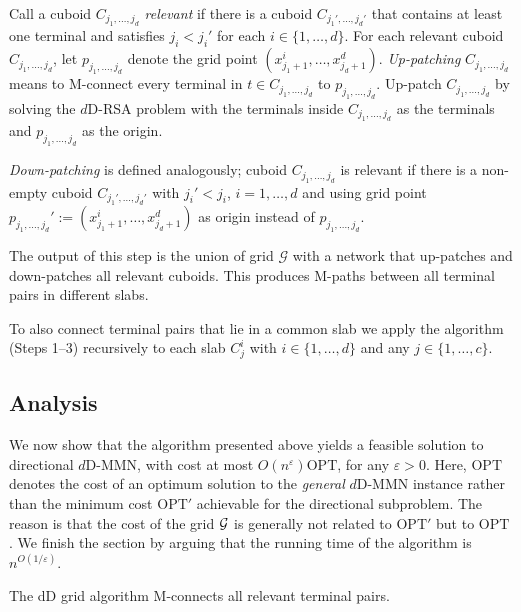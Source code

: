 \documentclass[11pt]{llncs}
\newcommand{\eps}{\ensuremath{\varepsilon}\xspace}
\newcommand{\opt}{\ensuremath{\mathrm{OPT}}\xspace}
\begin{document}
 Call a cuboid $C_{j_1,\dots,j_d}$
\emph{relevant} if there is a cuboid $C_{j_1',\dots,j_d'}$ that
contains at least one terminal and satisfies $j_i<j_i'$ for each
$i\in\{1,\dots,d\}$. For each relevant cuboid $C_{j_1,\dots,j_d}$, let
$p_{j_1,\dots,j_d}$ denote the grid point
$(x_{j_1+1}^i,\dots,x_{j_d+1}^d)$.  \emph{Up-patching}
$C_{j_1,\dots,j_d}$ means to M-connect every terminal in $t\in
C_{j_1,\dots,j_d}$ to $p_{j_1,\dots,j_d}$. Up-patch
$C_{j_1,\dots,j_d}$ by solving the $d$D-RSA problem with the terminals
inside $C_{j_1,\dots,j_d}$ as the terminals and $p_{j_1,\dots,j_d}$ as
the origin.

{\em Down-patching} is defined analogously; cuboid
$C_{j_1,\dots,j_d}$ is relevant if there is a non-empty cuboid
$C_{j_1',\dots,j_d'}$ with $j_i'<j_i$, $i=1,\dots,d$ and using grid
point $p_{j_1,\dots,j_d}':=(x_{j_1+1}^i,\dots,x_{j_d+1}^d)$ as origin
instead of $p_{j_1,\dots,j_d}$.

The output of this step is the union of grid $\mathcal G$ with a
network that up-patches and down-patches all relevant cuboids. This
produces M-paths between all terminal pairs in different slabs.

\smallskip
{}  To also connect
terminal pairs that lie in a common slab we apply the algorithm (Steps
1--3) recursively to each slab $C_j^i$ with $i\in\{1,\dots,d\}$ and
any $j\in\{1,\dots,c\}$.

\subsection*{Analysis}


We now show that the algorithm presented above
yields a feasible solution to directional
$d$D-MMN, with cost at most $O(n^\eps)\opt$, for any $\eps>0$. 
Here, \opt denotes
the cost of an optimum solution to the \emph{general} $d$D-MMN
instance rather than the minimum cost $\opt'$ achievable for the
directional subproblem.  The reason is that the cost of the grid $\cal
G$ is generally not related to $\opt'$ but to \opt.
We finish the section by arguing that the running time of the
algorithm is $n^{O(1/\eps)}$. 

\begin{lemma}[Feasibility]
  \label{lem:dd-mpaths}
  The dD grid algorithm M-connects all relevant terminal pairs. 
\end{lemma}
\end{document}
